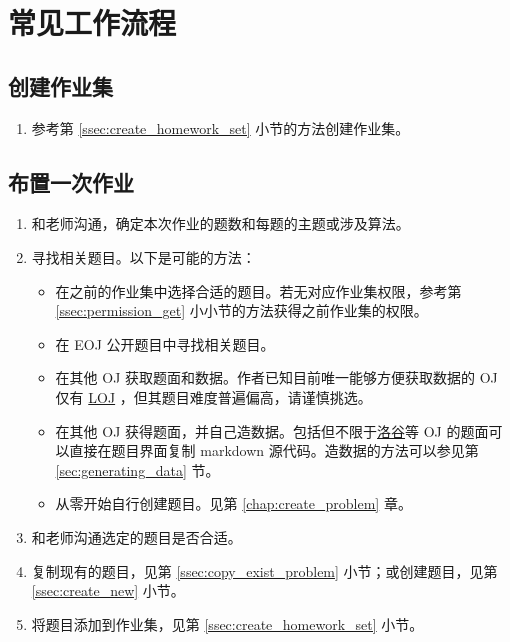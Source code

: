 \documentclass[oneside]{book}
\begin{document}
\chapter{常见工作流程}

\label{chap:workflow}

\section{创建作业集}

\begin{enumerate}
  \item 参考第 \ref{ssec:create_homework_set} 小节的方法创建作业集。
\end{enumerate}

\section{布置一次作业}

\label{sec:set_homework}

\begin{enumerate}
  \item 和老师沟通，确定本次作业的题数和每题的主题或涉及算法。
  \item 寻找相关题目。以下是可能的方法：
  \begin{itemize}
    \item 在之前的作业集中选择合适的题目。若无对应作业集权限，参考第 \ref{ssec:permission_get} 小小节的方法获得之前作业集的权限。
    \item 在 EOJ 公开题目中寻找相关题目。
    \item 在其他 OJ 获取题面和数据。作者已知目前唯一能够方便获取数据的 OJ 仅有 \href{https://loj.ac/}{LOJ} ，但其题目难度普遍偏高，请谨慎挑选。
    \item 在其他 OJ 获得题面，并自己造数据。包括但不限于\href{https://www.luogu.com.cn/}{洛谷}等 OJ 的题面可以直接在题目界面复制 markdown 源代码。造数据的方法可以参见第 \ref{sec:generating_data} 节。
    \item 从零开始自行创建题目。见第 \ref{chap:create_problem} 章。
  \end{itemize}
  \item 和老师沟通选定的题目是否合适。
  \item 复制现有的题目，见第 \ref{ssec:copy_exist_problem} 小节；或创建题目，见第 \ref{ssec:create_new} 小节。
  \item 将题目添加到作业集，见第 \ref{ssec:create_homework_set} 小节。
\end{enumerate}
\end{document}

